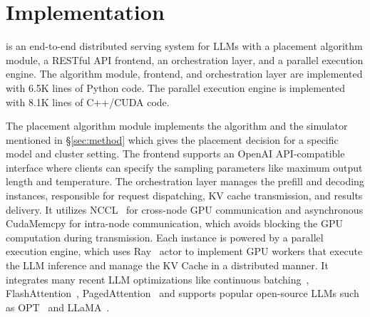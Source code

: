 \section{Implementation}
\label{sec:implementation}

\sys is an end-to-end distributed serving system for LLMs with a placement algorithm module, a RESTful API frontend, an orchestration layer, and a parallel execution engine. The algorithm module, frontend, and orchestration layer are implemented with 6.5K lines of Python code. The parallel execution engine is implemented with 8.1K lines of C++/CUDA code.

The placement algorithm module implements the algorithm and the simulator mentioned in \S\ref{sec:method} which gives the placement decision for a specific model and cluster setting. The frontend supports an OpenAI API-compatible interface where clients can specify the sampling parameters like maximum output length and temperature. The orchestration layer manages the prefill and decoding instances, responsible for request dispatching, KV cache transmission, and results delivery. It utilizes NCCL~\cite{nccl} for cross-node GPU communication and asynchronous CudaMemcpy for intra-node communication, which avoids blocking the GPU computation during transmission. Each instance is powered by a parallel execution engine, which uses Ray~\cite{ray} actor to implement GPU workers that execute the LLM inference and manage the KV Cache in a distributed manner. It integrates many recent LLM optimizations like continuous batching~\cite{yu2022orca}, FlashAttention~\cite{dao2022flashattention}, PagedAttention~\cite{vllm} and supports popular open-source LLMs such as OPT~\cite{zhang2022opt} and LLaMA~\cite{touvron2023llama}.
